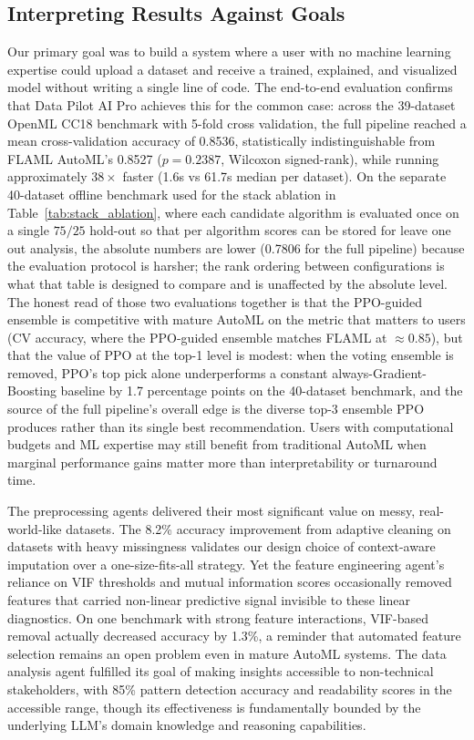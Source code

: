\documentclass{article}
\begin{document}
\subsection{Interpreting Results Against Goals}

Our primary goal was to build a system where a user with no machine learning
expertise could upload a dataset and receive a trained, explained, and
visualized model without writing a single line of code. The end-to-end
evaluation confirms that Data Pilot AI Pro achieves this for the common
case: across the 39-dataset OpenML CC18 benchmark with 5-fold cross
validation, the full pipeline reached a mean cross-validation accuracy of
0.8536, statistically indistinguishable from FLAML AutoML's 0.8527 ($p =
0.2387$, Wilcoxon signed-rank), while running approximately $38\times$
faster (1.6s vs 61.7s median per dataset). On the separate 40-dataset
offline benchmark used for the stack ablation in
Table~\ref{tab:stack_ablation}, where each candidate algorithm is evaluated
once on a single $75/25$ hold-out so that per algorithm scores can be stored
for leave one out analysis, the absolute numbers are lower (0.7806 for the
full pipeline) because the evaluation protocol is harsher; the rank ordering
between configurations is what that table is designed to compare and is
unaffected by the absolute level. The honest read of those two evaluations
together is that the PPO-guided ensemble is competitive with mature AutoML
on the metric that matters to users (CV accuracy, where the PPO-guided
ensemble matches FLAML at $\approx 0.85$), but that the value of PPO at
the top-1 level is modest:
when the voting ensemble is removed, PPO's top pick alone underperforms a
constant always-Gradient-Boosting baseline by 1.7 percentage points on the
40-dataset benchmark, and the source of the full pipeline's overall edge is
the diverse top-3 ensemble PPO produces rather than its single best
recommendation. Users with computational budgets and ML expertise may still
benefit from traditional AutoML when marginal performance gains matter more
than interpretability or turnaround time.

The preprocessing agents delivered their most significant value on messy, real-world-like datasets. The 8.2\% accuracy improvement from adaptive cleaning on datasets with heavy missingness validates our design choice of context-aware imputation over a one-size-fits-all strategy. Yet the feature engineering agent's reliance on VIF thresholds and mutual information scores occasionally removed features that carried non-linear predictive signal invisible to these linear diagnostics. On one benchmark with strong feature interactions, VIF-based removal actually decreased accuracy by 1.3\%, a reminder that automated feature selection remains an open problem even in mature AutoML systems. The data analysis agent fulfilled its goal of making insights accessible to non-technical stakeholders, with 85\% pattern detection accuracy and readability scores in the accessible range, though its effectiveness is fundamentally bounded by the underlying LLM's domain knowledge and reasoning capabilities.
\end{document}
